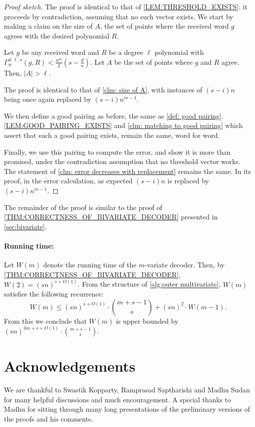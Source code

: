 \documentclass{article}
\def\abs#1{\left| #1 \right|}
\begin{document}
	\begin{proof}[Proof sketch]
		The proof is identical to that of \cref{LEM:THRESHOLD_EXISTS}:
		it  proceeds by contradiction, assuming that no such vector exists. We start by making a claim on the size of $A$, the set of points where the received word $g$ agrees with the desired polynomial $R$. 
		
		\begin{claim} 
			Let $g$ be any received word and $R$ be a degree $\ell$ polynomial with $\Gamma_w^{d, \ell, s} (g, R) < \frac{n^m}{2}(s-\frac{d}{n})$. Let $A$ be the set of points where $g$ and $R$ agree. Then, $\abs{A} > \ell$. 
		\end{claim}
		
		\begin{subproof}
			The proof is identical to that of \autoref{clm: size of A}, with instances of $(s-i)n$ being once again replaced by $(s-i)n^{m-1}$. 
		\end{subproof}
		
		We then define a good pairing as before, the same as \cref{def: good pairing}. \cref{LEM:GOOD_PAIRING_EXISTS} and \autoref{clm: matching to good pairing} which assert that such a good pairing exists, remain the same, word for word.
		
		Finally, we use this pairing to compute the error, and show it is more than promised, under the contradiction assumption that no threshold vector works. The statement of \autoref{clm: error decreases with replacement} remains the same. In its proof, in the error calculation, as expected $(s-i)n$ is replaced by $(s-i)n^{m-1}$. 
	\end{proof}
	
	The remainder of the proof is similar to the proof of \cref{THM:CORRECTNESS_OF_BIVARIATE_DECODER} presented in \cref{sec:bivariate}.
	
	\paragraph{Running time:} Let $W(m)$ denote the running time of the $m$-variate decoder. Then, by \cref{THM:CORRECTNESS_OF_BIVARIATE_DECODER}, $W(2)=(sn)^{s+O(1)}$. From the structure of \cref{alg:outer multivariate}, $W(m)$ satisfies the following recurrence:
	\[
	W(m)\leq (sn)^{s+O(1)}\cdot \binom{m+s-1}{s} + (sn)^{2}\cdot W(m-1).
	\]
	From this we conclude that $W(m)$ is upper bounded by $(sn)^{3m+s+O(1)}\cdot \binom{m+s-1}{s}$.
	
	\section*{Acknowledgements}
	We are thankful to Swastik Kopparty,  Ramprasad Saptharishi and Madhu Sudan for many helpful discussions and much encouragement. 
	A special thanks to Madhu for sitting through many long presentations of the preliminary versions of the proofs and his comments.  

    \newpage
	
\end{document}
